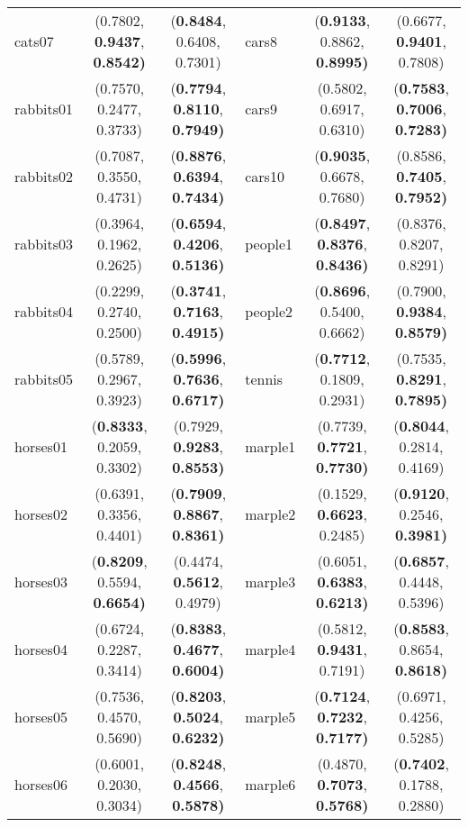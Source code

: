 \begin{table*}[!t]
\begin{tabular}{lcc|lcc}
      cats07 &  (0.7802, \textbf{0.9437}, \textbf{0.8542)} &  (\textbf{0.8484}, 0.6408, 0.7301) &       cars8 &  (\textbf{0.9133}, 0.8862, \textbf{0.8995)} &  (0.6677, \textbf{0.9401}, 0.7808) \\
   rabbits01 &  (0.7570, 0.2477, 0.3733) &  (\textbf{0.7794}, \textbf{0.8110}, \textbf{0.7949)} &       cars9 &  (0.5802, 0.6917, 0.6310) &  (\textbf{0.7583}, \textbf{0.7006}, \textbf{0.7283)} \\
   rabbits02 &  (0.7087, 0.3550, 0.4731) &  (\textbf{0.8876}, \textbf{0.6394}, \textbf{0.7434)} &      cars10 &  (\textbf{0.9035}, 0.6678, 0.7680) &  (0.8586, \textbf{0.7405}, \textbf{0.7952)} \\
   rabbits03 &  (0.3964, 0.1962, 0.2625) &  (\textbf{0.6594}, \textbf{0.4206}, \textbf{0.5136)} &     people1 &  (\textbf{0.8497}, \textbf{0.8376}, \textbf{0.8436)} &  (0.8376, 0.8207, 0.8291) \\
   rabbits04 &  (0.2299, 0.2740, 0.2500) &  (\textbf{0.3741}, \textbf{0.7163}, \textbf{0.4915)} &     people2 &  (\textbf{0.8696}, 0.5400, 0.6662) &  (0.7900, \textbf{0.9384}, \textbf{0.8579)} \\
   rabbits05 &  (0.5789, 0.2967, 0.3923) &  (\textbf{0.5996}, \textbf{0.7636}, \textbf{0.6717)} &      tennis &  (\textbf{0.7712}, 0.1809, 0.2931) &  (0.7535, \textbf{0.8291}, \textbf{0.7895)} \\
    horses01 &  (\textbf{0.8333}, 0.2059, 0.3302) &  (0.7929, \textbf{0.9283}, \textbf{0.8553)} &     marple1 &  (0.7739, \textbf{0.7721}, \textbf{0.7730)} &  (\textbf{0.8044}, 0.2814, 0.4169) \\
    horses02 &  (0.6391, 0.3356, 0.4401) &  (\textbf{0.7909}, \textbf{0.8867}, \textbf{0.8361)} &     marple2 &  (0.1529, \textbf{0.6623}, 0.2485) &  (\textbf{0.9120}, 0.2546, \textbf{0.3981)} \\
    horses03 &  (\textbf{0.8209}, 0.5594, \textbf{0.6654)} &  (0.4474, \textbf{0.5612}, 0.4979) &     marple3 &  (0.6051, \textbf{0.6383}, \textbf{0.6213)} &  (\textbf{0.6857}, 0.4448, 0.5396) \\
    horses04 &  (0.6724, 0.2287, 0.3414) &  (\textbf{0.8383}, \textbf{0.4677}, \textbf{0.6004)} &     marple4 &  (0.5812, \textbf{0.9431}, 0.7191) &  (\textbf{0.8583}, 0.8654, \textbf{0.8618)} \\
    horses05 &  (0.7536, 0.4570, 0.5690) &  (\textbf{0.8203}, \textbf{0.5024}, \textbf{0.6232)} &     marple5 &  (\textbf{0.7124}, \textbf{0.7232}, \textbf{0.7177)} &  (0.6971, 0.4256, 0.5285) \\
    horses06 &  (0.6001, 0.2030, 0.3034) &  (\textbf{0.8248}, \textbf{0.4566}, \textbf{0.5878)} &     marple6 &  (0.4870, \textbf{0.7073}, \textbf{0.5768)} &  (\textbf{0.7402}, 0.1788, 0.2880) \\

\end{tabular}
\end{table*}
